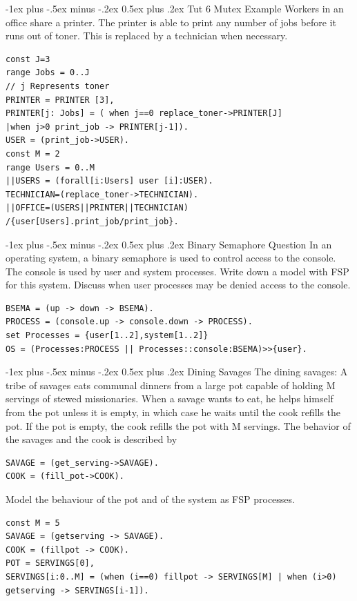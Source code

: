 \documentclass[letterpaper, 8pt]{extarticle}
\makeatletter
\renewcommand{\section}{\@startsection{section}{1}{0mm}%
                                {-1ex plus -.5ex minus -.2ex}%
                                {0.5ex plus .2ex}%
                                {\normalfont\normalsize\bfseries}}
\makeatother
\begin{document}
\begin{multicols*}{5}
  \section{Tut 6 Mutex Example}
  Workers in an office share a printer. The printer is able to print any number of jobs before it runs out of toner. This is replaced by a technician when necessary.
  \begin{lstlisting}
const J=3
range Jobs = 0..J
// j Represents toner
PRINTER = PRINTER [3],
PRINTER[j: Jobs] = ( when j==0 replace_toner->PRINTER[J] 
|when j>0 print_job -> PRINTER[j-1]).
USER = (print_job->USER).
const M = 2
range Users = 0..M
||USERS = (forall[i:Users] user [i]:USER).
TECHNICIAN=(replace_toner->TECHNICIAN).
||OFFICE=(USERS||PRINTER||TECHNICIAN)
/{user[Users].print_job/print_job}.
\end{lstlisting}

  \section{Binary Semaphore Question}
  In an operating system, a binary semaphore is used to control access to the console. The console is used by user and system processes. Write down a model with FSP for this system. Discuss when user processes may be denied access to the console.
  \begin{lstlisting}
BSEMA = (up -> down -> BSEMA).
PROCESS = (console.up -> console.down -> PROCESS).
set Processes = {user[1..2],system[1..2]}
OS = (Processes:PROCESS || Processes::console:BSEMA)>>{user}.
\end{lstlisting}

  \section{Dining Savages}
  The dining savages: A tribe of savages eats communal dinners from a large pot capable of holding M servings of stewed missionaries. When a savage wants to eat, he helps himself from the pot unless it is empty, in which case he waits until the cook refills the pot. If the pot is empty, the cook refills the pot with M servings. The behavior of the savages and the cook is described by
  \begin{lstlisting}
SAVAGE = (get_serving->SAVAGE).
COOK = (fill_pot->COOK).
\end{lstlisting}
  Model the behaviour of the pot and of the system as FSP processes.
  \begin{lstlisting}
const M = 5
SAVAGE = (getserving -> SAVAGE).
COOK = (fillpot -> COOK).
POT = SERVINGS[0],
SERVINGS[i:0..M] = (when (i==0) fillpot -> SERVINGS[M] | when (i>0) getserving -> SERVINGS[i-1]).


\end{lstlisting}
\end{multicols*}
\end{document}
